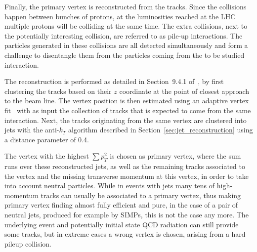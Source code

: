 Finally, the primary vertex is reconstructed from the tracks. Since the collisions happen between bunches of protons, at the luminosities reached at the \ac{LHC} multiple protons will be colliding at the same time. The extra collisions, next to the potentially interesting collision, are referred to as pile-up interactions. The particles generated in these collisions are all detected simultaneously and form a challenge to disentangle them from the particles coming from the to be studied interaction.


The reconstruction is performed as detailed in Section~9.4.1 of~\cite{CMSCollaboration:2015zni}, by first clustering the tracks based on their $z$ coordinate at the point of closest approach to the beam line. The vertex position is then estimated using an adaptive vertex fit~\cite{Fruhwirth:2007hz} with as input the collection of tracks that is expected to come from the same interaction. Next, the tracks originating from the same vertex are clustered into jets with the anti-$k_T$ algorithm described in Section~\ref{sec:jet_reconstruction} using a distance parameter of 0.4.


The vertex with the highest $\sum p_T^2$ is chosen as primary vertex, where the sum runs over these reconstructed jets, as well as the remaining tracks associated to the vertex and the missing transverse momentum at this vertex, in order to take into account neutral particles.
While in events with jets many tens of high-momentum tracks can usually be associated to a primary vertex, thus making primary vertex finding almost fully efficient and pure, in the case of a pair of neutral jets, produced for example by \acp{SIMP}, this is not the case any more. The underlying event and potentially initial state \acs{QCD} radiation can still provide some tracks, but in extreme cases a wrong vertex is chosen, arising from a hard pileup collision.

